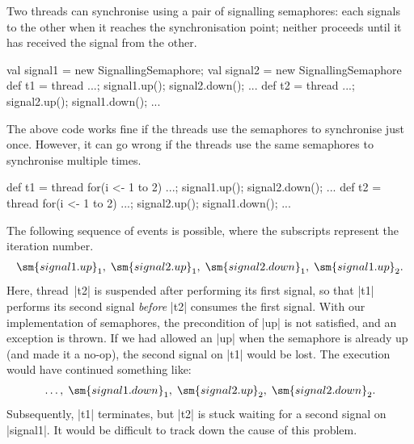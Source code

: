 Two threads can synchronise using a pair of signalling semaphores: each
signals to the other when it reaches the synchronisation point; neither
proceeds until it has received the signal from the other.
\begin{scala}
  val signal1 = new SignallingSemaphore; val signal2 = new SignallingSemaphore
  def t1 = thread{ ...; signal1.up(); signal2.down(); ... }
  def t2 = thread{ ...; signal2.up(); signal1.down(); ... }
\end{scala}


The above code works fine if the threads use the semaphores to synchronise
just once.  However, it can go wrong if the threads use the same semaphores to
synchronise multiple times.
%
\begin{scala}
  def t1 = thread{ for(i <- 1 to 2){ ...; signal1.up(); signal2.down(); ... } }
  def t2 = thread{ for(i <- 1 to 2){ ...; signal2.up(); signal1.down(); ... } }
\end{scala}
%
The following sequence of events is possible, where the
subscripts represent the iteration number.
\[
\begin{align}
\sm{signal1.up}_1,\; \sm{signal2.up}_1,\; \sm{signal2.down}_1,\;
   \sm{signal1.up}_2.
\end{align}
\]
Here, thread~|t2| is suspended after performing its first signal, so that |t1|
performs its second signal \emph{before} |t2| consumes the first signal.  With
our implementation of semaphores, the precondition of |up| is not satisfied,
and an exception is thrown.  If we had allowed an |up| when the semaphore is
already up (and made it a no-op), the second signal on |t1| would be lost.
The execution would have continued something like:
\[
\begin{align}
\ldots,\; \sm{signal1.down}_1,\; \sm{signal2.up}_2,\; \sm{signal2.down}_2.
\end{align}
\]
Subsequently, |t1| terminates, but |t2| is stuck waiting for a second signal
on |signal1|.  It would be difficult to track down the cause of this problem. 

